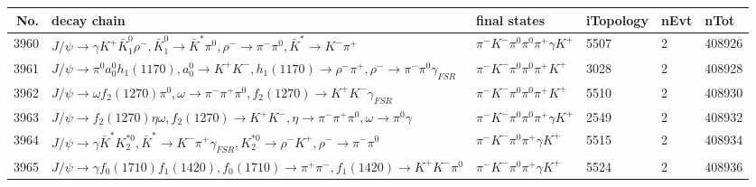 \begin{table}[htbp] 
\begin{center}
\begin{small}
\begin{tabular}{rlllll}\hline\hline
 No. & decay chain & final states &  iTopology & nEvt & nTot \\\hline
3960&$J/\psi       \rightarrow \gamma       K^{+}          \bar{K}_1^{0} \rho^{-}      , \bar{K}_1^{0}  \rightarrow \bar{K}^{*}   \pi^{0}        , \rho^{-}       \rightarrow \pi^{-}        \pi^{0}        , \bar{K}^{*}    \rightarrow K^{-}          \pi^{+}        $&$\pi^{-}        K^{-}          \pi^{0}        \pi^{0}        \pi^{+}        \gamma       K^{+}          $& 5507&    2&408926\\
3961&$J/\psi       \rightarrow \pi^{0}        a_{0}^{0}      h_{1}(1170)    , a_{0}^{0}       \rightarrow K^{+}          K^{-}          , h_{1}(1170)     \rightarrow \rho^{-}      \pi^{+}        , \rho^{-}       \rightarrow \pi^{-}        \pi^{0}        \gamma_{FSR} $&$\pi^{-}        K^{-}          \pi^{0}        \pi^{0}        \pi^{+}        K^{+}          $& 3028&    2&408928\\
3962&$J/\psi       \rightarrow \omega         f_{2}(1270)    \pi^{0}        , \omega          \rightarrow \pi^{-}        \pi^{+}        \pi^{0}        , f_{2}(1270)     \rightarrow K^{+}          K^{-}          \gamma_{FSR} $&$\pi^{-}        K^{-}          \pi^{0}        \pi^{0}        \pi^{+}        K^{+}          $& 5510&    2&408930\\
3963&$J/\psi       \rightarrow f_{2}(1270)    \eta          \omega         , f_{2}(1270)     \rightarrow K^{+}          K^{-}          , \eta           \rightarrow \pi^{-}        \pi^{+}        \pi^{0}        , \omega          \rightarrow \pi^{0}        \gamma       $&$\pi^{-}        K^{-}          \pi^{0}        \pi^{0}        \pi^{+}        \gamma       K^{+}          $& 2549&    2&408932\\
3964&$J/\psi       \rightarrow \gamma       \bar{K}^{*}   K_2^{*0}       , \bar{K}^{*}    \rightarrow K^{-}          \pi^{+}        \gamma_{FSR} , K_2^{*0}        \rightarrow \rho^{-}      K^{+}          , \rho^{-}       \rightarrow \pi^{-}        \pi^{0}        $&$\pi^{-}        K^{-}          \pi^{0}        \pi^{+}        \gamma       K^{+}          $& 5515&    2&408934\\
3965&$J/\psi       \rightarrow \gamma       f_{0}(1710)    f_{1}(1420)    , f_{0}(1710)     \rightarrow \pi^{+}        \pi^{-}        , f_{1}(1420)     \rightarrow K^{+}          K^{-}          \pi^{0}        $&$\pi^{-}        K^{-}          \pi^{0}        \pi^{+}        \gamma       K^{+}          $& 5524&    2&408936\\

\end{tabular}
\end{small}
\end{center}
\end{table}
